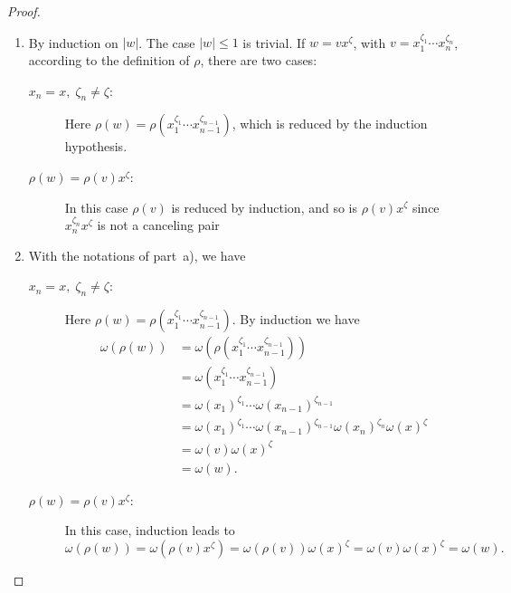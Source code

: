 \begin{proof}${}$
    \begin{enumerate}[\rm a)]
        \item By induction on $|w|$. The case $|w|\le1$ is trivial. If $w=vx^\zeta$, with $v=x_1^{\zeta_1}\cdots x_n^{\zeta_n}$, according to the definition of $\rho$, there are two cases:
        \begin{description}
            \item[\rm\underline{\rm$x_n=x,\;\zeta_n\ne\zeta$}:] Here $\rho(w)=\rho(x_1^{\zeta_1}\cdots x_{n-1}^{\zeta_{n-1}})$, which is reduced by the induction hypothesis.
            
            \item[\rm\underline{$\rho(w)=\rho(v)x^\zeta$}:] In this case $\rho(v)$ is reduced by induction, and so is $\rho(v)x^\zeta$ since $x_n^{\zeta_n}x^\zeta$ is not a canceling pair
        \end{description}

        \item With the notations of part~a), we have
        \begin{description}
            \item[\rm\underline{\rm$x_n=x,\;\zeta_n\ne\zeta$}:] Here $\rho(w)=\rho(x_1^{\zeta_1}\cdots x_{n-1}^{\zeta_{n-1}})$. By induction we have
            \begin{align*}
                \omega(\rho(w))
                    &= \omega(\rho(x_1^{\zeta_1}\cdots x_{n-1}^{\zeta_{n-1}}))\\
                    &= \omega(x_1^{\zeta_1}\cdots x_{n-1}^{\zeta_{n-1}})\\
                    &= \omega(x_1)^{\zeta_1}\cdots\omega(x_{n-1})^{\zeta_{n-1}}\\
                    &= \omega(x_1)^{\zeta_1}\cdots\omega(x_{n-1})^{\zeta_{n-1}}
                        \omega(x_n)^{\zeta_n}\omega(x)^\zeta\\
                    &= \omega(v)\omega(x)^\zeta\\
                    &= \omega(w).
            \end{align*}
            
            \item[\rm\underline{$\rho(w)=\rho(v)x^\zeta$}:] In this case, induction leads to
            $$
                \omega(\rho(w))
                    =\omega(\rho(v)x^\zeta)
                    =\omega(\rho(v))\omega(x)^\zeta
                    =\omega(v)\omega(x)^\zeta
                    = \omega(w).
            $$
        \end{description}


\end{enumerate}
\end{proof}

